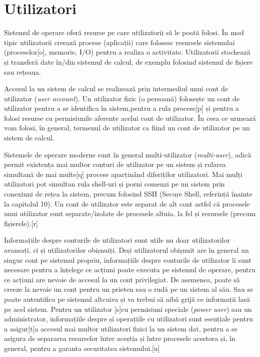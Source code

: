 \chapter{Utilizatori}
\label{chapter:users}

Sistemul de operare oferă resurse pe care utilizatorii să le poată folosi. În
mod tipic utilizatorii creează procese (aplicații) care folosesc resursele
sistemului (proceselor[o], memorie, I/O) pentru a realiza o activitate.
Utilizatorii stochează și transferă date în/din sistemul de calcul, de exemplu
folosind sistemul de fișiere sau rețeaua.

Accesul la un sistem de calcul se realizează prin intermediul unui cont de
utilizator (\textit{user account}). Un utilizator fizic (o persoană) folosește
un cont de utilizator pentru a se identifica în sistem,pentru a rula procese[p]
și pentru a folosi resurse cu permisiunile aferente acelui cont de utilizator.
În ceea ce urmează vom folosi, în general, termenul de utilizator ca fiind un
cont de utilizator pe un sistem de calcul.

Sistemele de operare moderne sunt în general multi-utilizator
(\textit{multi-user}), adică permit existența mai multor conturi de utilizator
pe un sistem și rularea simultană de mai multe[q] procese aparținând diferiților
utilizatori. Mai mulți utilizatori pot simultan rula shell-uri și porni comenzi
pe un sistem prin conexiuni de rețea la sistem, precum folosind SSH (Secure
Shell, referință înainte la capitolul 10). Un cont de utilizator este separat de
alt cont astfel că procesele unui utilizator sunt separate/izolate de procesele
altuia, la fel și resursele (precum fișierele).[r]

Informațiile despre conturile de utilizatori sunt utile nu doar utilizatorilor
avansați, ci și utilizatorilor obișnuiți. Deși utilizatorul obișnuit are în
general un singur cont pe sistemul propriu, informațiile despre conturile de
utilizator îi sunt necesare pentru a înțelege ce acțiuni poate executa pe
sistemul de operare, pentru ce acțiuni are nevoie de accesul la un cont
privilegiat. De asemenea, poate să creeze la nevoie un cont pentru un prieten
sau o rudă pe un sistem al său. Sau se poate autentifica pe sistemul altcuiva și
va trebui să aibă grijă ce informații lasă pe acel sistem. Pentru un utilizator
[s]cu permisiuni speciale (\textit{power user}) sau un administrator,
informațiile despre și operațiile cu utilizatori sunt esențiale pentru a
asigur[t]a accesul mai multor utilizatori fizici la un sistem dat, pentru a se
asigura de separarea resurselor între aceștia și între procesele acestora și, în
general, pentru a garanta securitatea sistemului.[u]

